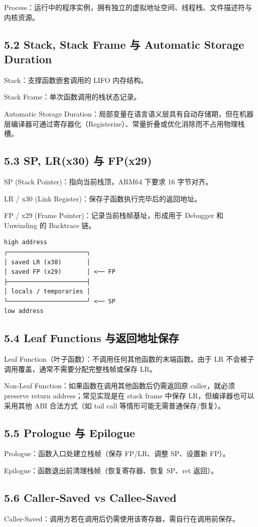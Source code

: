 \documentclass[11pt,a4paper]{article}
\begin{document}
Process：运行中的程序实例，拥有独立的虚拟地址空间、线程栈、文件描述符与内核资源。

\subsection{5.2 Stack, Stack Frame 与 Automatic Storage Duration}
Stack：支撑函数嵌套调用的 LIFO 内存结构。

Stack Frame：单次函数调用的栈状态记录。

Automatic Storage Duration：局部变量在语言语义层具有自动存储期，但在机器层编译器可通过寄存器化（Registerize）、常量折叠或优化消除而不占用物理栈槽。

\subsection{5.3 SP, LR(x30) 与 FP(x29)}
SP (Stack Pointer)：指向当前栈顶，ARM64 下要求 16 字节对齐。

LR / x30 (Link Register)：保存子函数执行完毕后的返回地址。

FP / x29 (Frame Pointer)：记录当前栈帧基址，形成用于 Debugger 和 Unwinding 的 Backtrace 链。

\begin{lstlisting}[language=text]
high address
┌──────────────────────┐
│ saved LR (x30)       │
│ saved FP (x29)       │ <── FP
├──────────────────────┤
│ locals / temporaries │
└──────────────────────┘ <── SP
low address
\end{lstlisting}
\subsection{5.4 Leaf Functions 与返回地址保存}
Leaf Function（叶子函数）：不调用任何其他函数的末端函数。由于 LR 不会被子调用覆盖，通常不需要分配完整栈帧或保存 LR。

Non-Leaf Function：如果函数在调用其他函数后仍需返回原 caller，就必须 preserve return address；常见实现是在 stack frame 中保存 LR，但编译器也可以采用其他 ABI 合法方式（如 tail call 等情形可能无需普通保存/恢复）。

\subsection{5.5 Prologue 与 Epilogue}
Prologue：函数入口处建立栈帧（保存 FP/LR、调整 SP、设置新 FP）。

Epilogue：函数退出前清理栈帧（恢复寄存器、恢复 SP、ret 返回）。

\subsection{5.6 Caller-Saved vs Callee-Saved}
Caller-Saved：调用方若在调用后仍需使用该寄存器，需自行在调用前保存。
\end{document}
